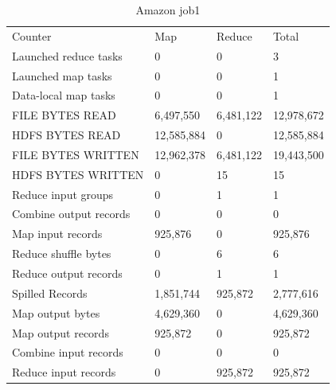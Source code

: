\documentclass[paper=a4, fontsize=11pt]{scrartcl}	%
\numberwithin{equation}{section}															%
\numberwithin{figure}{section}																%
\numberwithin{table}{section}																%
\begin{document}
\begin{table}[]
	\centering
	\caption{Amazon job1}
	\label{my-label}
	\begin{tabular}{llll}
		Counter&	Map&	Reduce&	Total\\
		Launched reduce tasks&	0&	0&	3\\
		Launched map tasks&	0&	0&	1\\
		Data-local map tasks&	0&	0&	1\\
		FILE BYTES READ&	6,497,550&	6,481,122&	12,978,672\\
		HDFS BYTES READ&	12,585,884&	0&	12,585,884\\
		FILE BYTES WRITTEN&	12,962,378&	6,481,122&	19,443,500\\
		HDFS BYTES WRITTEN&	0&	15&	15\\
		Reduce input groups&	0&	1&	1\\
		Combine output records&	0&	0&	0\\
		Map input records&	925,876&	0&	925,876\\
		Reduce shuffle bytes&	0&	6&	6\\
		Reduce output records&	0&	1&	1\\
		Spilled Records&	1,851,744&	925,872&	2,777,616\\
		Map output bytes&	4,629,360&	0&	4,629,360\\
		Map output records&	925,872&	0&	925,872\\
		Combine input records&	0&	0&	0\\
		Reduce input records&	0&	925,872&	925,872\\
		
	\end{tabular}
\end{table}
\end{document}

